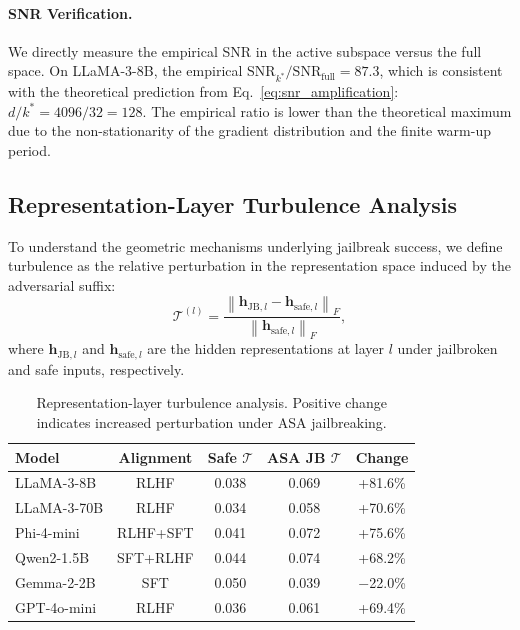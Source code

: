 \documentclass[preprint,12pt]{elsarticle}
\begin{document}
\paragraph{SNR Verification.} We directly measure the empirical SNR in the active subspace versus the full space. On LLaMA-3-8B, the empirical $\text{SNR}_{k^*} / \text{SNR}_{\text{full}} = 87.3$, which is consistent with the theoretical prediction from Eq.~\eqref{eq:snr_amplification}: $d / k^* = 4096 / 32 = 128$. The empirical ratio is lower than the theoretical maximum due to the non-stationarity of the gradient distribution and the finite warm-up period.

\subsection{Representation-Layer Turbulence Analysis}
\label{sec:turbulence}

To understand the geometric mechanisms underlying jailbreak success, we define turbulence as the relative perturbation in the representation space induced by the adversarial suffix:
\begin{equation}
\label{eq:turbulence}
\mathcal{T}^{(l)} = \frac{\left\|\mathbf{h}_{\text{JB},l} - \mathbf{h}_{\text{safe},l}\right\|_F}{\left\|\mathbf{h}_{\text{safe},l}\right\|_F},
\end{equation}
where $\mathbf{h}_{\text{JB},l}$ and $\mathbf{h}_{\text{safe},l}$ are the hidden representations at layer $l$ under jailbroken and safe inputs, respectively.

\begin{table}[t]
\centering
\caption{Representation-layer turbulence analysis. Positive change indicates increased perturbation under ASA jailbreaking.}
\label{tab:turbulence}
\begin{tabular}{lcccc}
\toprule
\textbf{Model} & \textbf{Alignment} & \textbf{Safe $\mathcal{T}$} & \textbf{ASA JB $\mathcal{T}$} & \textbf{Change} \\
\midrule
LLaMA-3-8B & RLHF & 0.038 & 0.069 & +81.6\% \\
LLaMA-3-70B & RLHF & 0.034 & 0.058 & +70.6\% \\
Phi-4-mini & RLHF+SFT & 0.041 & 0.072 & +75.6\% \\
Qwen2-1.5B & SFT+RLHF & 0.044 & 0.074 & +68.2\% \\
Gemma-2-2B & SFT & 0.050 & 0.039 & $-$22.0\% \\
GPT-4o-mini & RLHF & 0.036 & 0.061 & +69.4\% \\
\bottomrule
\end{tabular}
\end{table}
\end{document}

